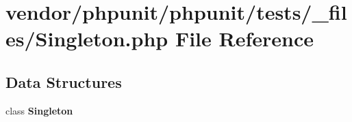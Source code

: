 \section{vendor/phpunit/phpunit/tests/\+\_\+files/\+Singleton.php File Reference}
\label{_singleton_8php}
\subsection*{Data Structures}
\begin{DoxyCompactItemize}
\item 
class {\bf Singleton}
\end{DoxyCompactItemize}
